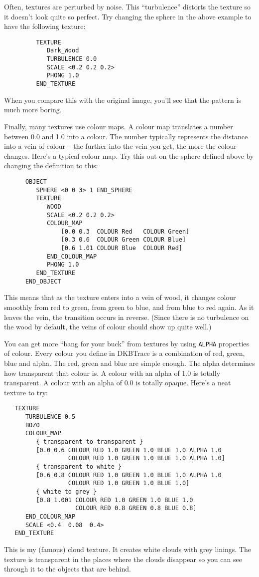 Often, textures are perturbed by noise.  This ``turbulence''
%
distorts the
texture so it doesn't look quite so perfect.  Try changing the sphere in the
above example to have the following texture:
\begin{verbatim}
         TEXTURE
            Dark_Wood
            TURBULENCE 0.0
            SCALE <0.2 0.2 0.2>
            PHONG 1.0
         END_TEXTURE
\end{verbatim}
When you compare this with the original image, you'll see that the pattern is
much more boring.

Finally, many textures use colour maps.
A colour map translates a number
between 0.0 and 1.0 into a colour.  The number typically represents the
distance into a vein of colour -- the further into the vein you get, the more
the colour changes.  Here's a typical colour map.  Try this out on the sphere
defined above by changing the definition to this:
\begin{verbatim}
      OBJECT
         SPHERE <0 0 3> 1 END_SPHERE
         TEXTURE
            WOOD
            SCALE <0.2 0.2 0.2>
            COLOUR_MAP
                [0.0 0.3  COLOUR Red   COLOUR Green]
                [0.3 0.6  COLOUR Green COLOUR Blue]
                [0.6 1.01 COLOUR Blue  COLOUR Red]
            END_COLOUR_MAP
            PHONG 1.0
         END_TEXTURE
      END_OBJECT
\end{verbatim}
This means that as the texture enters into a vein of wood, it changes colour
smoothly from red to green, from green to blue, and from blue to red again.
As it leaves the vein, the transition occurs in reverse.  (Since there is no
turbulence on the wood by default, the veins of colour should show up quite
well.)

You can get more ``bang for your buck'' from textures by using
{\tt ALPHA} properties of colour.  Every
colour you define in DKBTrace is a
combination of red, green, blue and alpha.  The red, green and blue
are simple enough.  The alpha determines how transparent that colour
is.  A colour with an alpha of 1.0 is totally transparent.  A colour
with an alpha of 0.0 is totally opaque.  Here's a neat texture to try:
\begin{verbatim}
   TEXTURE
      TURBULENCE 0.5
      BOZO
      COLOUR_MAP
         { transparent to transparent }
         [0.0 0.6 COLOUR RED 1.0 GREEN 1.0 BLUE 1.0 ALPHA 1.0
                  COLOUR RED 1.0 GREEN 1.0 BLUE 1.0 ALPHA 1.0]
         { transparent to white }
         [0.6 0.8 COLOUR RED 1.0 GREEN 1.0 BLUE 1.0 ALPHA 1.0
                  COLOUR RED 1.0 GREEN 1.0 BLUE 1.0]
         { white to grey }
         [0.8 1.001 COLOUR RED 1.0 GREEN 1.0 BLUE 1.0
                    COLOUR RED 0.8 GREEN 0.8 BLUE 0.8]
      END_COLOUR_MAP
      SCALE <0.4  0.08  0.4>
   END_TEXTURE
\end{verbatim}
This is my (famous) cloud texture.
It creates white clouds with grey linings.
The texture is transparent in the places where the clouds disappear so you can
see through it to the objects that are behind.

